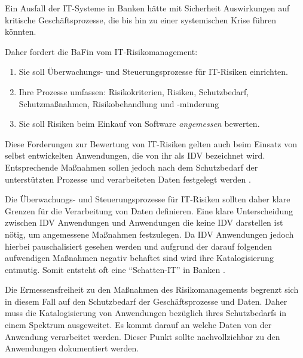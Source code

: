 Ein Ausfall der IT-Systeme in Banken hätte mit Sicherheit Auswirkungen auf kritische Geschäftsprozesse, die bis hin zu einer systemischen Krise führen könnten.

Daher fordert die \ac{BaFin} \cite{MaRisk:2017} vom IT-Risikomanagement:
\begin{enumerate}
    \item Sie soll Überwachungs- und Steuerungsprozesse für IT-Risiken einrichten.
    \item Ihre Prozesse umfassen: Risikokriterien, Risiken, Schutzbedarf, Schutzmaßnahmen, Risikobehandlung und -minderung
    \item Sie soll Risiken beim Einkauf von Software \emph{angemessen} bewerten.
\end{enumerate}
Diese Forderungen \cite{MaRisk:2017} zur Bewertung von IT-Risiken gelten auch beim Einsatz von selbst entwickelten Anwendungen, die von ihr als \ac{IDV} bezeichnet wird. Entsprechende Maßnahmen sollen jedoch nach dem Schutzbedarf der unterstützten Prozesse und verarbeiteten Daten festgelegt werden \cite{MaRisk:2017}.

Die Überwachungs- und Steuerungsprozesse für IT-Risiken sollten daher klare Grenzen für die Verarbeitung von Daten definieren. Eine klare Unterscheidung zwischen \ac{IDV} Anwendungen und Anwendungen die keine \ac{IDV} darstellen ist nötig, um angemessene Maßnahmen festzulegen. Da \ac{IDV} Anwendungen jedoch hierbei pauschalisiert gesehen werden und aufgrund der darauf folgenden aufwendigen Maßnahmen negativ behaftet sind wird ihre Katalogisierung entmutig. Somit entsteht oft eine \enquote{Schatten-IT} in Banken \cite{Dorschel2018}.

Die Ermessensfreiheit zu den Maßnahmen des Risikomanagements begrenzt sich in diesem Fall auf den Schutzbedarf der Geschäftsprozesse und Daten. Daher muss die Katalogisierung von Anwendungen bezüglich ihres Schutzbedarfs in einem Spektrum ausgeweitet. Es kommt darauf an welche Daten von der Anwendung verarbeitet werden. Dieser Punkt sollte nachvollziehbar zu den Anwendungen dokumentiert werden.

